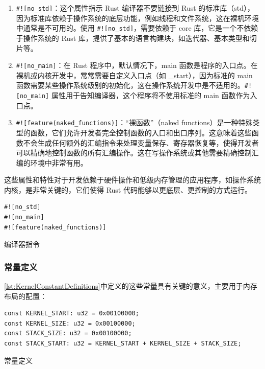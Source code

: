 \begin{enumerate}
    \item \texttt{\#![no\_std]}：这个属性指示 Rust 编译器不要链接到 Rust 的标准库（std），因为标准库依赖于操作系统的底层功能，例如线程和文件系统，这在裸机环境中通常是不可用的。使用 \texttt{\#![no\_std]}，需要依赖于 core 库，它是一个不依赖于操作系统的 Rust 库，提供了基本的语言构建块，如迭代器、基本类型和切片等。
    \item \texttt{\#![no\_main]}：在 Rust 程序中，默认情况下，main 函数是程序的入口点。在裸机或内核开发中，常常需要自定义入口点（如 \_start），因为标准的 main 函数需要某些操作系统级别的初始化，这在操作系统开发中是不适用的。\texttt{\#![no\_main]} 属性用于告知编译器，这个程序将不使用标准的 main 函数作为入口点。
    \item \texttt{\#![feature(naked\_functions)]}：“裸函数”（naked functions）是一种特殊类型的函数，它们允许开发者完全控制函数的入口和出口序列。这意味着这些函数不会生成任何额外的汇编指令来处理变量保存、寄存器恢复等，使得开发者可以精确地控制函数的所有汇编操作。这在写操作系统或其他需要精确控制汇编的环境中非常有用。
\end{enumerate}

这些属性和特性对于开发依赖于硬件操作和低级内存管理的应用程序，如操作系统内核，是非常关键的，它们使得 Rust 代码能够以更底层、更控制的方式运行。

\begin{listing}[htbp]
    \begin{verbatim}
#![no_std]
#![no_main]
#![feature(naked_functions)]
    \end{verbatim}
    \caption{编译器指令}\label{lst:CompilerDirectives}
\end{listing}

\subsubsection{常量定义}

\cref{lst:KernelConstantDefinitions}中定义的这些常量具有关键的意义，主要用于内存布局的配置：

\begin{listing}[htbp]
    \begin{verbatim}
const KERNEL_START: u32 = 0x00100000;
const KERNEL_SIZE: u32 = 0x00100000;
const STACK_SIZE: u32 = 0x00100000;
const STACK_START: u32 = KERNEL_START + KERNEL_SIZE + STACK_SIZE;
    \end{verbatim}
    \caption{常量定义}\label{lst:KernelConstantDefinitions}
\end{listing}

